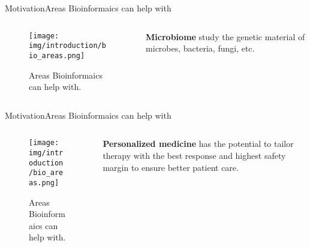 \documentclass[10pt]{beamer}
\newcommand{\1}{
        	\setbeamertemplate{background}{
        		\texttt{[image: img/1]}
        		\tikz[overlay] \fill[fill opacity=0.75,fill=white] (0,0) rectangle (-\paperwidth,\paperheight);
        	}
}
\begin{document}
\begin{frame}{Motivation}{Areas Bioinformaics can help with}
	\begin{columns}
		\begin{column}{0.68\textwidth}
			
			\begin{figure}[]
				\centering
				\texttt{[image: img/introduction/bio\_areas.png]}
				\label{img:mot2}
				\caption{Areas Bioinformaics can help with.}
			\end{figure}
		\end{column}
		\begin{column}{0.28\textwidth}
			\textbf{Microbiome} study the genetic material of microbes, bacteria, fungi, etc.
		\end{column}
	\end{columns}
\end{frame}

\begin{frame}{Motivation}{Areas Bioinformaics can help with}
	\begin{columns}
		\begin{column}{0.68\textwidth}
			
			\begin{figure}[]
				\centering
				\texttt{[image: img/introduction/bio\_areas.png]}
				\label{img:mot2}
				\caption{Areas Bioinformaics can help with.}
			\end{figure}
		\end{column}
		\begin{column}{0.28\textwidth}
			\textbf{Personalized medicine} has the potential to tailor therapy with the best response and highest safety margin to ensure better patient care.
		\end{column}
	\end{columns}
\end{frame}
\end{document}
